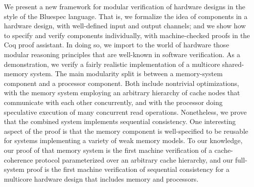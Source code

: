 We present a new framework for modular verification of hardware designs
in the style of the Bluespec language.  That is, we formalize the idea of
components in a hardware design, with well-defined input and output channels;
and we show how to specify and verify components individually, with
machine-checked proofs in the Coq proof assistant.  In doing so, we import
to the world of hardware those modular reasoning principles that are
well-known in software verification.  As a demonstration, we verify a
fairly realistic implementation of a multicore shared-memory system.  The
main modularity split is between a memory-system component and a processor
component.  Both include nontrivial optimizations, with the memory system
employing an arbitrary hierarchy of cache nodes that communicate with each
other concurrently, and with the processor doing speculative execution of
many concurrent read operations.  Nonetheless, we prove that the combined
system implements sequential consistency.  One interesting aspect of the proof
is that the memory component is well-specified to be reusable for systems
implementing a variety of weak memory models.  To our knowledge, our proof
of that memory system is the first machine verification of a cache-coherence
protocol parameterized over an arbitrary cache hierarchy, and our full-system
proof is the first machine verification of sequential consistency for a
multicore hardware design that includes memory and processors.
